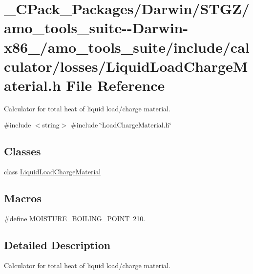 \hypertarget{___c_pack___packages_2_darwin_2_s_t_g_z_2amo__tools__suite--_darwin-x86__64_2amo__tools__suite_22c7eb4395ab7cdaebdd8c8124e88f284}{}\section{\+\_\+\+C\+Pack\+\_\+\+Packages/\+Darwin/\+S\+T\+G\+Z/amo\+\_\+tools\+\_\+suite-\/-\/\+Darwin-\/x86\+\_/amo\+\_\+tools\+\_\+suite/include/calculator/losses/\+Liquid\+Load\+Charge\+Material.h File Reference}
\label{___c_pack___packages_2_darwin_2_s_t_g_z_2amo__tools__suite--_darwin-x86__64_2amo__tools__suite_22c7eb4395ab7cdaebdd8c8124e88f284}


Calculator for total heat of liquid load/charge material.  


{\ttfamily \#include $<$string$>$}\newline
{\ttfamily \#include \char`\"{}Load\+Charge\+Material.\+h\char`\"{}}\newline
\subsection*{Classes}
\begin{DoxyCompactItemize}
\item 
class \hyperlink{class_liquid_load_charge_material}{Liquid\+Load\+Charge\+Material}
\end{DoxyCompactItemize}
\subsection*{Macros}
\begin{DoxyCompactItemize}
\item 
\#define \hyperlink{___c_pack___packages_2_darwin_2_s_t_g_z_2amo__tools__suite--_darwin-x86__64_2amo__tools__suite_22c7eb4395ab7cdaebdd8c8124e88f284_a8587e8eca9308654712d096366487575}{M\+O\+I\+S\+T\+U\+R\+E\+\_\+\+B\+O\+I\+L\+I\+N\+G\+\_\+\+P\+O\+I\+NT}~210.
\end{DoxyCompactItemize}


\subsection{Detailed Description}
Calculator for total heat of liquid load/charge material. 

